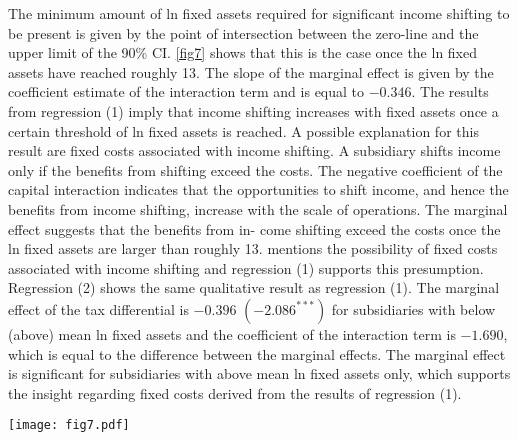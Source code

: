 \documentclass[10pt,twocolumn,oneside,cmyk]{article}
\begin{document}
The minimum amount of ln fixed assets required for significant income shifting to be present is given by the point of intersection between the zero-line and the upper limit of the 90\% CI. \cref{fig7} shows that this is the case once the ln fixed assets have reached roughly 13. The slope of the marginal effect is given by the coefficient estimate of the interaction term and is equal to $-0.346$. The results from regression (1) imply that income shifting increases with fixed assets once a certain threshold of ln fixed assets is reached. A possible explanation for this result are fixed costs associated with income shifting. A subsidiary shifts income only if the benefits from shifting exceed the costs. The negative coefficient of the capital interaction indicates that the opportunities to shift income, and hence the benefits from income shifting, increase with the scale of operations. The marginal effect suggests that the benefits from in- come shifting exceed the costs once the ln fixed assets are larger than roughly 13. \textcite[423-424]{dharmapala_what_2014} mentions the possibility of fixed costs associated with income shifting and regression (1) supports this presumption. Regression (2) shows the same qualitative result as regression (1). The marginal effect of the tax differential is $-0.396$ $(-2.086^{***})$ for subsidiaries with below (above) mean ln fixed assets and the coefficient of the interaction term is $-1.690$, which is equal to the difference between the marginal effects. The marginal effect is significant for subsidiaries with above mean ln fixed assets only, which supports the insight regarding fixed costs derived from the results of regression (1).

\begin{figure*}[t]
 \centering \captionsetup{width=0.95\textwidth}
   \texttt{[image: fig7.pdf]}
 \caption[Marginal effect of the tax differential in regressions (1) and (3) in \cref{tab7}]{Marginal effect of the tax differential in regressions (1) and (3) in \cref{tab7}. The solid line shows the marginal effect according to the partial derivative of regression (4) in \cref{tab6}, and the shaded area represents the 90\% confidence interval. The grey bar indicates the range of the middle 90\% of the distribution of tax differentials (observations between the $5^{th}$ and $95^{th}$ percentile). Source: own figure, based on \textcite[661]{berry_improving_2012}} \label{fig7}
\end{figure*}
\end{document}
